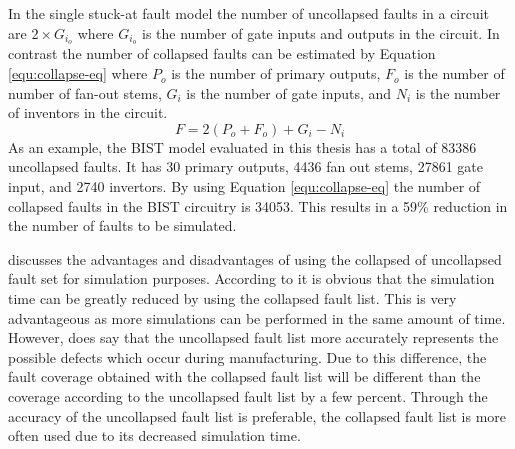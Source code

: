 \documentclass[12pt]{report}
\begin{document}
In the single stuck-at fault model the number of uncollapsed faults in a circuit are $2 \times G_i_o$ where $G_i_o$ is the number of gate inputs and outputs in the circuit.  In contrast the number of collapsed faults can be estimated by Equation \ref{equ:collapse-eq} where $P_o$ is the number of primary outputs, $F_o$ is the number of number of fan-out stems, $G_i$ is the number of gate inputs, and $N_i$ is the number of inventors in the circuit\cite{stroud}.
\begin{equation}
F = 2(P_o + F_o) + G_i - N_i
\label{equ:collapse-eq}
\end{equation}
As an example, the BIST model evaluated in this thesis has a total of 83386 uncollapsed faults.  It has 30 primary outputs, 4436 fan out stems, 27861 gate input, and 2740 invertors.  By using Equation \ref{equ:collapse-eq} the number of collapsed faults in the BIST circuitry is 34053.  This results in a 59\% reduction in the number of faults to be simulated.  

\cite{stroud} discusses the advantages and disadvantages of using the collapsed of uncollapsed fault set for simulation purposes.  According to \cite{stroud} it is obvious that the simulation time can be greatly reduced by using the collapsed fault list.  This is very advantageous as more simulations can be performed in the same amount of time.  However, \cite{stroud} does say that the uncollapsed fault list more accurately represents the possible defects which occur during manufacturing.  Due to this difference, the fault coverage obtained with the collapsed fault list will be different than the coverage according to the uncollapsed fault list by a few percent\cite{stroud}.  Through the accuracy of the uncollapsed fault list is preferable, the collapsed fault list is more often used due to its decreased simulation time\cite{stroud}.
\end{document}
